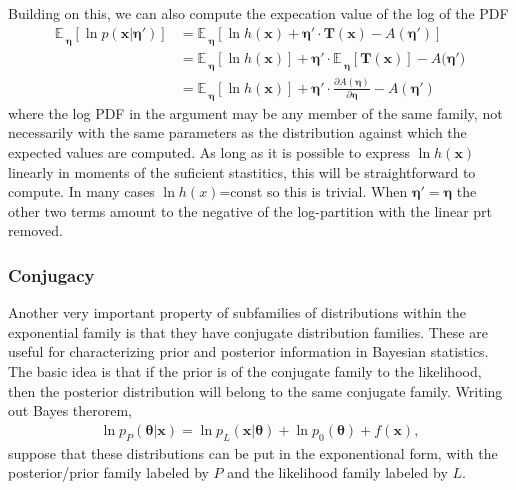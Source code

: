 \documentclass[aps,showpacs,twocolumn,prd,superscriptaddress,nofootinbib]{revtex4}
\newcommand{\E}[1]{{\mathbb E}_{#1}\!}
\begin{document}
Building on this, we can also compute the expecation value of the log of the PDF
\begin{align}
    {\E\,}_{\bm\eta}[\ln{p(\bm x|\bm \eta')}]
    &={\E\,}_{\bm\eta}[\ln{h(\bm x)}+\bm\eta' \cdot \bm T(\bm x) -A({\bm\eta'})]\nonumber\\
    &={\E\,}_{\bm\eta}[\ln{h(\bm x)}]+\bm\eta' \cdot {\E\,}_{\bm\eta}[\bm T(\bm x)] -A({\bm\eta')}\nonumber\\
    &={\E\,}_{\bm\eta}[\ln{h(\bm x)}]+\bm\eta' \cdot \frac{\partial A(\bm\eta)}{\partial\bm\eta} -A({\bm\eta'})
\end{align}
where the log PDF in the argument may be any member of the same family, not necessarily with the same parameters as the distribution against which the expected values are computed. As long as it is possible to express $\ln h(\bm x)$ linearly in moments of the suficient stastitics, this will be straightforward to compute.  In many cases $\ln h(x)$=const so this is trivial.  When $\bm\eta'=\bm\eta$ the other two terms amount to the negative of the log-partition with the linear prt removed.

\subsubsection{Conjugacy}

Another very important property of subfamilies of distributions within the exponential family is that they have conjugate distribution families. These are useful for characterizing prior and posterior information in Bayesian statistics.  The basic idea is that if the prior is of the conjugate family to the likelihood, then the posterior distribution will belong to the same conjugate family. Writing out Bayes therorem,
\begin{align}
  \ln p_P(\bm\theta|\bm x) = \ln p_L(\bm x|\bm\theta) + \ln p_0(\bm\theta) + f(\bm x),
\end{align}
suppose that these distributions can be put in the exponentional form, with the posterior/prior family labeled by $P$ and the likelihood family labeled by $L$.
\end{document}
